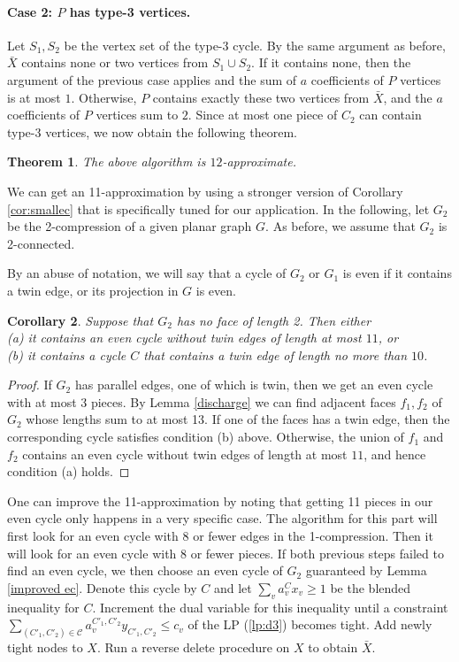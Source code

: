 \documentclass{article}
\newcommand{\C}{\ensuremath{\mathcal{C}}}
\newcommand{\0}{\mathbb{0}}
\newcommand{\1}{\mathbb{1}}
\newtheorem{theorem}{Theorem}[section]
\newtheorem{corollary}[theorem]{Corollary}
\begin{document}
\paragraph{Case 2: $P$ has type-3 vertices.}

Let $S_1,S_2$ be the vertex set of the type-3 cycle. By the same argument as before, 
$\bar{X}$ contains none or two vertices from $S_1 \cup S_2$. If it contains none, then the
argument of the previous case applies and the sum of $a$ coefficients of $P$ vertices is
at most $1$. Otherwise, $P$ contains exactly these two vertices from $\bar{X}$, and the
$a$ coefficients of $P$ vertices sum to $2$. Since at most one piece of $C_2$ can contain
type-3 vertices, we now obtain the following theorem. 

\begin{theorem}
  The above algorithm is $12$-approximate. 
\end{theorem}

We can get an 11-approximation by using a stronger version of Corollary \ref{cor:smallec}
that is specifically tuned for our application. In the following, let $G_2$ be the
2-compression of a given planar graph $G$. As before, we assume that $G_2$ is 2-connected.

By an abuse of notation, we will say that a cycle of $G_2$ or $G_1$ is even if it contains a twin edge, or its projection in $G$ is even.
\begin{corollary}\label{cor:smallec improved}
Suppose that $G_2$ has no face of length 2. Then either \\ (a) it contains an even cycle without twin edges of length at most $11$, or \\ (b) it contains a cycle $C$ that contains a twin edge of length no more than $10$. 
\end{corollary}
\begin{proof} 
If $G_2$ has parallel edges, one of which is twin, then we get an even cycle with at most 3 pieces.
By Lemma \ref{discharge} we can find adjacent faces $f_1,f_2$ of $G_2$ whose lengths sum
to at most 13. If one of the faces has a twin edge, then the corresponding cycle satisfies
condition (b) above. Otherwise, the union of $f_1$ and $f_2$ contains an even cycle
without twin edges of length at most $11$, and hence condition (a) holds. 
\end{proof}
One can improve the 11-approximation by noting that getting 11 pieces in our even cycle only happens in a very specific case. The algorithm for this part will first look for an even cycle with 8 or fewer edges in the 1-compression. Then it will look for an even cycle with 8 or fewer pieces. If both previous steps failed to find an even cycle, we then choose an even cycle of $G_2$ guaranteed by Lemma \ref{improved ec}. Denote this cycle by $C$ and let $\sum_v a_v^C x_v \geq 1 $ be the blended inequality for $C$. Increment the dual variable for this inequality until a  constraint $\sum_{(C'_1,C'_2) \in \C} a^{C'_1,C'_2}_vy_{C'_1,C'_2} \leq c_v $ of the LP (\ref{lp:d3}) becomes tight. Add newly tight nodes to $X$. Run a reverse delete procedure on $X$ to obtain $\bar{X}$.
\end{document}
